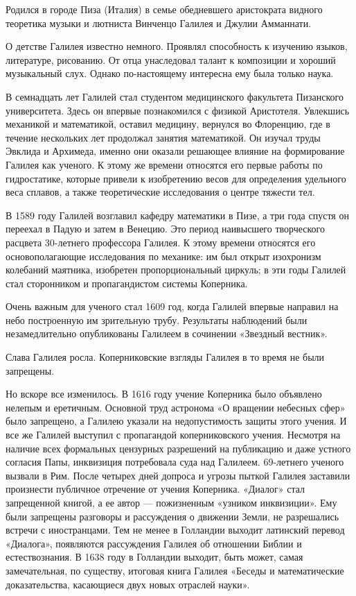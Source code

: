\documentclass[a4paper, 14pt]{extreport}
\begin{document}
Родился в городе Пиза (Италия) в семье обедневшего аристократа видного
теоретика музыки и лютниста Винченцо Галилея и Джулии Амманнати.

О детстве Галилея известно немного. Проявлял способность к изучению
языков, литературе, рисованию. От отца унаследовал талант к композиции и
хороший музыкальный слух. Однако по-настоящему интересна ему была только
наука.

В семнадцать лет Галилей стал студентом медицинского факультета
Пизанского университета. Здесь он впервые познакомился с физикой
Аристотеля. Увлекшись механикой и математикой, оставил медицину,
вернулся во Флоренцию, где в течение нескольких лет продолжал занятия
математикой. Он изучал труды Эвклида и Архимеда, именно они оказали
решающее влияние на формирование Галилея как ученого. К этому же времени
относятся его первые работы по гидростатике, которые привели к
изобретению весов для определения удельного веса сплавов, а также
теоретические исследования о центре тяжести тел.

В 1589 году Галилей возглавил кафедру математики в Пизе, а три года
спустя он переехал в Падую и затем в Венецию. Это период наивысшего
творческого расцвета 30-летнего профессора Галилея. К этому времени
относятся его основополагающие исследования по механике: им был открыт
изохронизм колебаний маятника, изобретен пропорциональный циркуль; в эти
годы Галилей стал сторонником и пропагандистом системы Коперника.

Очень важным для ученого стал 1609 год, когда Галилей впервые направил
на небо построенную им зрительную трубу. Результаты наблюдений были
незамедлительно опубликованы Галилеем в сочинении «Звездный вестник».

Слава Галилея росла. Коперниковские взгляды Галилея в то время не были
запрещены.

Но вскоре все изменилось. В 1616 году учение Коперника было объявлено
нелепым и еретичным. Основной труд астронома «О вращении небесных сфер»
было запрещено, а Галилею указали на недопустимость защиты этого учения.
И все же Галилей выступил с пропагандой коперниковского учения. Несмотря
на наличие всех формальных цензурных разрешений на публикацию и даже
устного согласия Папы, инквизиция потребовала суда над Галилеем.
69-летнего ученого вызвали в Рим. После четырех дней допроса и угрозы
пыткой Галилея заставили произнести публичное отречение от учения
Коперника. «Диалог» стал запрещенной книгой, а ее автор --- пожизненным
«узником инквизиции». Ему были запрещены разговоры и рассуждения о
движении Земли, не разрешались встречи с иностранцами. Тем не менее в
Голландии выходит латинский перевод «Диалога», появляются рассуждения
Галилея об отношении Библии и естествознания. В 1638 году в Голландии
выходит, быть может, самая замечательная, по существу, итоговая книга
Галилея «Беседы и математические доказательства, касающиеся двух новых
отраслей науки».
\end{document}
